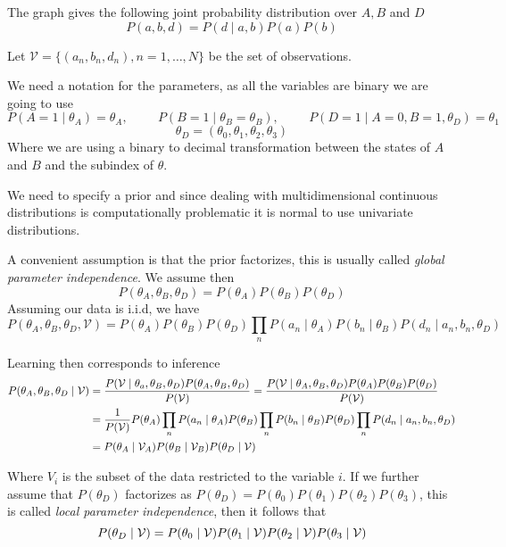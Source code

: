The graph gives the following joint probability distribution over \(A, B\) and \(D\)
\[
P(a,b,d) = P(d\mid a,b)P(a)P(b)
\]

Let \(\mathcal{V} = \{(a_{n}, b_{n}, d_{n}), n = 1,\dots , N\}\) be the set of observations.

We need a notation for the parameters, as all the variables are binary we are
going to use
\[
  P(A = 1 \mid \theta_{A}) = \theta_{A}, \hspace{1cm} P(B = 1 \mid \theta_{B} = \theta_{B}), \hspace{1cm} P(D = 1 \mid A = 0, B = 1, \theta_{D}) = \theta_{1}
\]
\[
  \theta_{D} = ( \theta_{0}, \theta_{1}, \theta_{2},\theta_{3})
\]
Where we are using a binary to decimal transformation between the states of \(A\) and \(B\) and the subindex of \(\theta\).

We need to specify a prior and since dealing with multidimensional continuous
distributions is computationally problematic it is normal to use univariate
distributions.

A convenient assumption is that the prior factorizes, this is usually called
\emph{global parameter independence}. We assume then
\[
  P(\theta_{A}, \theta_{B}, \theta_{D}) = P(\theta_{A})P(\theta_{B})P(\theta_{D})
\]
Assuming our data is i.i.d, we have
\[
  P(\theta_{A}, \theta_{B}, \theta_{D}, \mathcal{V}) = P(\theta_{A})P(\theta_{B})P(\theta_{D})\prod_{n}P(a_{n}\mid \theta_{A})P(b_{n} \mid \theta_{B})P(d_{n}\mid a_{n}, b_{n}, \theta_{D})
\]

Learning then corresponds to inference
\[
  \begin{aligned}
    P(\theta_{A}, \theta_{B}, \theta_{D}\mid \mathcal{V}) &= \frac{P(\mathcal{V} \mid \theta_{a}, \theta_{B}, \theta_{D})P(\theta_{A}, \theta_{B}, \theta_{D})}{P(\mathcal{V})} =\frac{P(\mathcal{V} \mid \theta_{A}, \theta_{B}, \theta_{D})P(\theta_{A}) P(\theta_{B})P( \theta_{D})}{P(\mathcal{V})}\\
    &= \frac{1}{P(\mathcal{V})}P(\theta_{A})\prod_{n}P(a_{n}\mid \theta_{A})P(\theta_{B})\prod_{n}P(b_{n}\mid \theta_{B})P(\theta_{D})\prod_{n}P(d_{n}\mid a_{n}, b_{n},\theta_{D})\\
    &= P(\theta_{A} \mid \mathcal{V}_{A} )P(\theta_{B}\mid \mathcal{V}_{B})P(\theta_{D} \mid \mathcal{V})
  \end{aligned}
\]

Where \(V_{i}\) is the subset of the data restricted to the variable \(i\). If
we further assume that \(P(\theta_{D})\) factorizes as
\(P(\theta_{D}) = P(\theta_{0})P(\theta_{1})P(\theta_{2})P(\theta_{3})\),
this is called \emph{local parameter independence}, then it follows that
\[
  P(\theta_{D}\mid \mathcal{V}) = P(\theta_{0} \mid \mathcal{V} )P(\theta_{1} \mid \mathcal{V} )P(\theta_{2} \mid \mathcal{V} )P(\theta_{3} \mid \mathcal{V} )
\]

